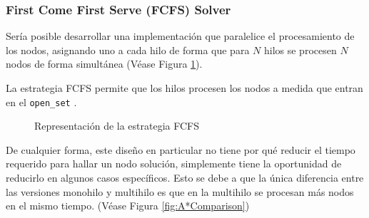 \subsubsection{First Come First Serve (FCFS) Solver}

Sería posible desarrollar una implementación que paralelice el procesamiento de los nodos,
asignando uno a cada hilo de forma que para $N$ hilos se procesen $N$ nodos
de forma simultánea (Véase Figura \ref{fig:RepresentacionFCFS}).
\begin{keynotebox}
La estrategia FCFS permite que los hilos procesen los nodos a medida que entran en 
el \lstinline{open_set} .
\end{keynotebox}

\begin{figure}[h]
    \begin{center}
    \end{center}
    \caption{Representación de la estrategia FCFS}
    \label{fig:RepresentacionFCFS}
\end{figure}

De cualquier forma, este diseño en particular no tiene por qué reducir el tiempo
requerido para hallar un nodo solución, simplemente tiene la oportunidad de reducirlo
en algunos casos específicos.
Esto se debe a que la única diferencia entre las versiones monohilo y multihilo
es que en la multihilo se procesan más nodos en el mismo tiempo.
(Véase Figura \ref{fig:A*Comparison})


